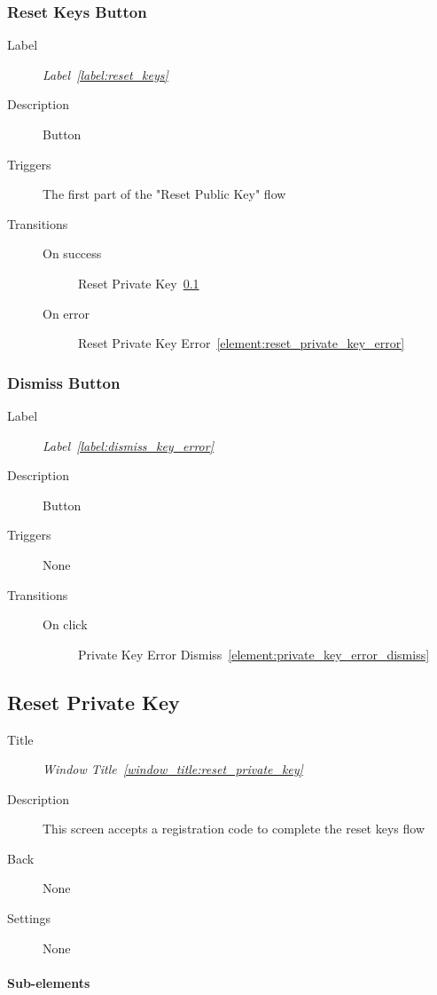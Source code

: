 \documentclass[a4paper,10pt]{article}
\newcommand{\windowTitleLabelText}{Window Title}
\newcommand{\windowTitleLabel}{window_title:}
\DeclareRobustCommand{\windowTitleRef}[1]{%
   \emph{\windowTitleLabelText~\ref{\windowTitleLabel#1}}}
\newcommand{\labelLabelText}{Label}
\newcommand{\labelLabel}{label:}
\DeclareRobustCommand{\labelRef}[1]{%
   \emph{\labelLabelText~\ref{\labelLabel#1}}}
\newcommand{\elementLabel}{element:}
\DeclareRobustCommand{\element}[2]{\subsection{#1}\label{\elementLabel#2}}
\DeclareRobustCommand{\elementRef}[1]{\ref{\elementLabel#1}}
\begin{document}
\subsubsection{Reset Keys Button}
\begin{description}
 \item[Label] \labelRef{reset_keys}
 \item[Description] Button
 \item[Triggers] The first part of the "Reset Public Key" flow
 \item[Transitions]\mbox{}
 \begin{description}
  \item[On success] Reset Private Key~\elementRef{reset_private_key}
  \item[On error] Reset Private Key Error~\elementRef{reset_private_key_error}
 \end{description}
\end{description}

\subsubsection{Dismiss Button}
\begin{description}
 \item[Label] \labelRef{dismiss_key_error}
 \item[Description] Button
 \item[Triggers] None
 \item[Transitions]\mbox{}
 \begin{description}
  \item[On click] Private Key Error 
Dismiss~\elementRef{private_key_error_dismiss}
 \end{description}
\end{description}

\element{Reset Private Key}{reset_private_key}

\begin{description}
 \item[Title] \windowTitleRef{reset_private_key}
 \item[Description] This screen accepts a registration code to complete the 
reset keys flow
 \item[Back] None
 \item[Settings] None
\end{description}

\paragraph{Sub-elements}
\end{document}
